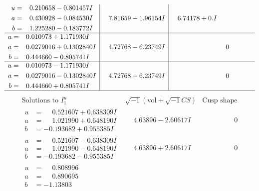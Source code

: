 \documentclass[1p]{elsarticle_modified}
\theoremstyle{definition}
\newcommand{\I}{\sqrt{-1}}
\begin{document}
$$\begin{array}{c|c|c}
\begin{aligned}
u &= \phantom{-}0.210658 - 0.801457 I \\
a &= \phantom{-}0.430928 - 0.084530 I \\
b &= \phantom{-}1.225280 - 0.183772 I\end{aligned}
 & \phantom{-}7.81659 - 1.96154 I & \phantom{-}6.74178 + 0. I\phantom{ +0.000000I} \\ \hline\begin{aligned}
u &= \phantom{-}0.010973 + 1.171930 I \\
a &= \phantom{-}0.0279016 + 0.1302840 I \\
b &= \phantom{-}0.444660 - 0.805741 I\end{aligned}
 & \phantom{-}4.72768 - 6.23749 I & \phantom{-0.000000 } 0 \\ \hline\begin{aligned}
u &= \phantom{-}0.010973 - 1.171930 I \\
a &= \phantom{-}0.0279016 - 0.1302840 I \\
b &= \phantom{-}0.444660 + 0.805741 I\end{aligned}
 & \phantom{-}4.72768 + 6.23749 I & \phantom{-0.000000 } 0\\
 \hline 
 \end{array}$$\newpage$$\begin{array}{c|c|c}  
\text{Solutions to }I^u_{1}& \I (\text{vol} + \sqrt{-1}CS) & \text{Cusp shape}\\
 \hline 
\begin{aligned}
u &= \phantom{-}0.521607 + 0.638309 I \\
a &= \phantom{-}1.021990 + 0.648190 I \\
b &= -0.193682 + 0.955385 I\end{aligned}
 & \phantom{-}4.63896 - 2.60617 I & \phantom{-0.000000 } 0 \\ \hline\begin{aligned}
u &= \phantom{-}0.521607 - 0.638309 I \\
a &= \phantom{-}1.021990 - 0.648190 I \\
b &= -0.193682 - 0.955385 I\end{aligned}
 & \phantom{-}4.63896 + 2.60617 I & \phantom{-0.000000 } 0 \\ \hline\begin{aligned}
u &= \phantom{-}0.808996\phantom{ +0.000000I} \\
a &= \phantom{-}0.890695\phantom{ +0.000000I} \\
b &= -1.13803\phantom{ +0.000000I}\end{aligned}

\end{array}$$
\end{document}
